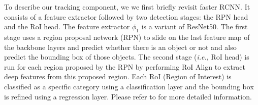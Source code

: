 
To describe our tracking component, we we first briefly revisit faster RCNN. It consists of a feature extractor followed by two detection stages: the RPN head and the RoI head.
The feature extractor $\phi_{1}$ is a variant of ResNet50. The first stage uses a region proposal network (RPN) to slide on the last feature map of the backbone layers and predict whether there is an object or not and also predict the bounding box of those objects. The second stage (\textit{i.e.}, RoI head) is run for each region proposed by the RPN by performing RoI Align \cite{he2017mask} to extract deep features from this proposed region. 
Each RoI (Region of Interest) is classified as a specific category using a classification layer and the bounding box is refined using a regression layer.
Please refer to \cite{ren2015faster} for more detailed information.

